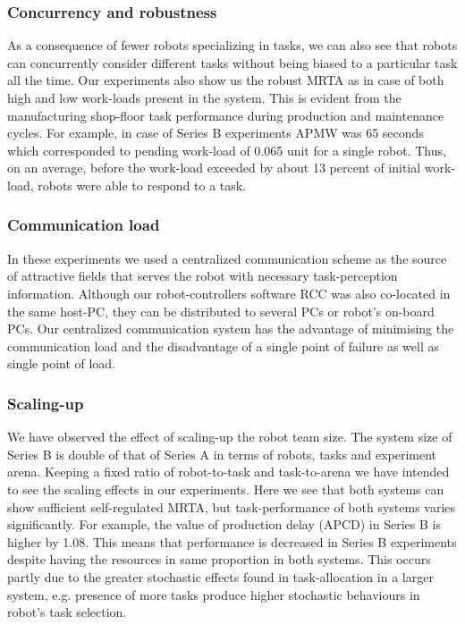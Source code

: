 \documentclass[smallcondensed]{svjour3}
\begin{document}
\subsubsection{Concurrency and robustness}
As a consequence of fewer robots specializing in tasks, we can also see that robots can concurrently  consider different tasks without being biased to a particular task all the time. Our experiments also show us the robust MRTA as in case of  both high and low work-loads present in the system. This is evident from the manufacturing shop-floor task performance during production and maintenance cycles. For example,  in case of Series B experiments APMW was 65 seconds which corresponded  to pending work-load of 0.065 unit for a single robot. Thus, on an average, before the work-load exceeded by about 13 percent of initial work-load, robots were able to respond to  a task.
\subsubsection{Communication load} 
In these experiments we used a centralized communication scheme as the source of attractive fields that serves the robot with necessary task-perception information. Although our robot-controllers software RCC was also co-located in the same host-PC, they can be distributed to several PCs or robot's on-board PCs. Our centralized communication system has the advantage of minimising the communication load and the disadvantage of a single point of failure as well as single point of load. 
\subsubsection{Scaling-up}
We have observed the effect of scaling-up the robot team size. The system size of Series B is double of that of Series A in terms of robots, tasks and experiment arena. Keeping a fixed ratio of robot-to-task and task-to-arena we have intended to see the scaling effects in our experiments. Here we see that both systems can show sufficient self-regulated MRTA, but task-performance of both systems varies significantly. For example, the value of production delay (APCD) in Series B is higher by 1.08. This means that performance  is decreased in Series B experiments despite having the resources in same proportion in both systems. This occurs partly due to the greater stochastic effects found in task-allocation in a larger system, e.g. presence of more tasks produce higher stochastic behaviours in robot's task selection.
\end{document}

